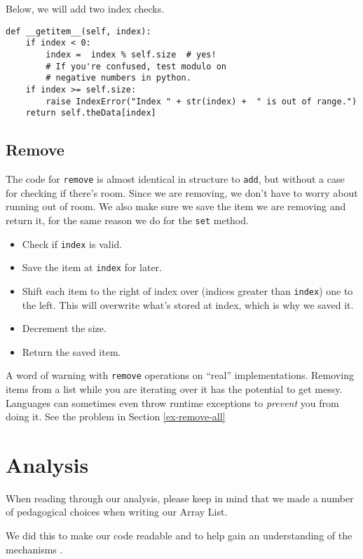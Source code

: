 Below, we will add two index checks.

\begin{verbatim}
def __getitem__(self, index):
	if index < 0: 
		index =  index % self.size  # yes! 
		# If you're confused, test modulo on 
		# negative numbers in python.
	if index >= self.size:
		raise IndexError("Index " + str(index) +  " is out of range.")       
	return self.theData[index]
\end{verbatim}


\subsection{Remove}


The code for \texttt{remove} is almost identical in structure to \texttt{add}, but without a case for checking if there's room.  Since we are removing, we don't have to worry about running out of room.  We also make sure we save the item we are removing and return it, for the same reason we do for the \texttt{set} method.
\begin{itemize}
	\item Check if \texttt{index} is valid.
	\item Save the item at \texttt{index} for later.
	\item Shift each item to the right of index over (indices greater than \texttt{index}) one to the left.  This will overwrite what's stored at index, which is why we saved it. 
	\item Decrement the size.
	\item Return the saved item.
	
\end{itemize}


A word of warning with \texttt{remove} operations on  ``real'' implementations.  Removing items from a list while you are iterating over it has the potential to get messy.  Languages can sometimes even throw runtime exceptions to \textit{prevent} you from doing it.  See the problem in Section \ref{ex-remove-all}

\section{Analysis}

When reading through our analysis, please keep in mind that we made a number of pedagogical choices when writing our Array List. 

We did this to make our code readable and to help gain an understanding of the mechanisms .

